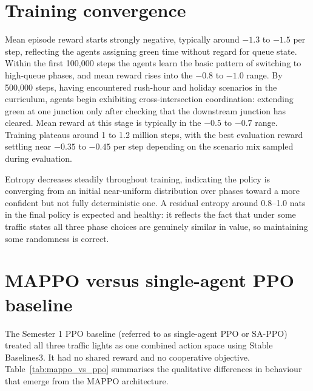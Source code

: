\documentclass[11pt, a4paper]{report}
\begin{document}
\section{Training convergence}

Mean episode reward starts strongly negative, typically around $-1.3$ to $-1.5$ per step, reflecting the agents assigning green time without regard for queue state. Within the first 100,000 steps the agents learn the basic pattern of switching to high-queue phases, and mean reward rises into the $-0.8$ to $-1.0$ range. By 500,000 steps, having encountered rush-hour and holiday scenarios in the curriculum, agents begin exhibiting cross-intersection coordination: extending green at one junction only after checking that the downstream junction has cleared. Mean reward at this stage is typically in the $-0.5$ to $-0.7$ range. Training plateaus around 1 to 1.2 million steps, with the best evaluation reward settling near $-0.35$ to $-0.45$ per step depending on the scenario mix sampled during evaluation.

Entropy decreases steadily throughout training, indicating the policy is converging from an initial near-uniform distribution over phases toward a more confident but not fully deterministic one. A residual entropy around 0.8--1.0 nats in the final policy is expected and healthy: it reflects the fact that under some traffic states all three phase choices are genuinely similar in value, so maintaining some randomness is correct.

\section{MAPPO versus single-agent PPO baseline}

The Semester 1 PPO baseline (referred to as single-agent PPO or SA-PPO) treated all three traffic lights as one combined action space using Stable Baselines3. It had no shared reward and no cooperative objective. Table~\ref{tab:mappo_vs_ppo} summarises the qualitative differences in behaviour that emerge from the MAPPO architecture.
\end{document}
